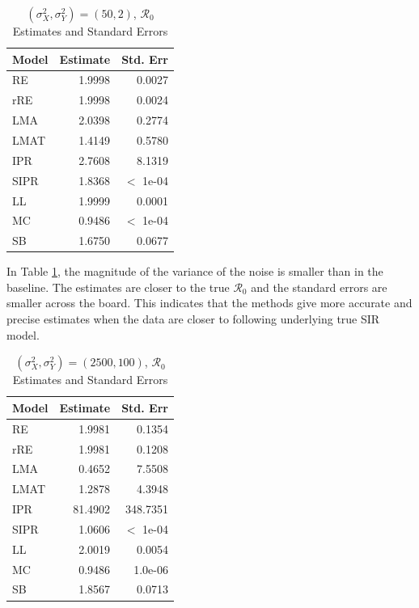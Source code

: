 \documentclass[12pt]{article}
\newcommand{\rr}{\ensuremath{\mathcal{R}_0}}
\begin{document}
\begin{table}[H]
	

	\centering
	\begin{tabular}[t]{l|r|r}
		\hline
		Model & Estimate & Std. Err\\
		\hline
		RE & 1.9998 & 0.0027\\
		\hline
		rRE & 1.9998 & 0.0024\\
		\hline
		LMA & 2.0398 & 0.2774\\
		\hline
		LMAT & 1.4149 & 0.5780\\
		\hline
		IPR & 2.7608 & 8.1319\\
		\hline
		SIPR & 1.8368 & $<$ 1e-04\\
		\hline
		LL & 1.9999 & 0.0001\\
		\hline
		MC & 0.9486 & $<$ 1e-04\\
		\hline
		SB & 1.6750 & 0.0677\\
		\hline
	\end{tabular}
        	\caption{ $(\sigma^2_X, \sigma^2_Y) = (50, 2)$, $\rr$ Estimates and Standard Errors}\label{tab:mag-var-res1}
\end{table}

In Table \ref{tab:mag-var-res1}, the magnitude of the variance of the noise is smaller than in the baseline. The estimates are closer to the true $\rr$ and the standard errors are smaller across the board. This indicates that the methods give more accurate and precise estimates when the data are closer to following underlying true SIR model.


\begin{table}[H]
	

	\centering
	\begin{tabular}[t]{l|r|r}
		\hline
		Model & Estimate & Std. Err\\
		\hline
		RE & 1.9981 & 0.1354\\
		\hline
		rRE & 1.9981 & 0.1208\\
		\hline
		LMA & 0.4652 & 7.5508\\
		\hline
		LMAT & 1.2878 & 4.3948\\
		\hline
		IPR & 81.4902 & 348.7351\\
		\hline
		SIPR & 1.0606 & $<$ 1e-04\\
		\hline
		LL & 2.0019 & 0.0054\\
		\hline
		MC & 0.9486 & 1.0e-06\\
		\hline
		SB & 1.8567 & 0.0713\\
		\hline
	\end{tabular}
        	\caption{$(\sigma^2_X, \sigma^2_Y) = (2500, 100)$, $\rr$ Estimates and Standard Errors}\label{tab:mag-var-res2}
\end{table}
\end{document}
